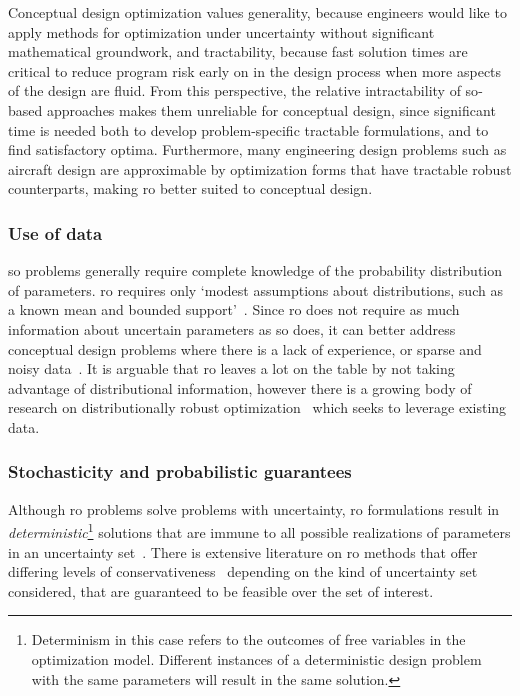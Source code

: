 Conceptual design optimization values generality, because engineers would like to
apply methods for optimization under uncertainty without significant mathematical groundwork,
and tractability, because fast solution times are critical
to reduce program risk early on in the design process when more aspects
of the design are fluid. From this perspective, the relative intractability of
\gls{so}-based approaches makes them unreliable for conceptual design, since significant time is
needed both to develop problem-specific tractable formulations, and to find satisfactory optima.
Furthermore,
many engineering design problems such as aircraft design are approximable by optimization
forms that have tractable robust counterparts, making \gls{ro} better suited
to conceptual design.

\subsubsection{Use of data}

\gls{so} problems generally require complete knowledge of the probability distribution of
parameters.
\gls{ro} requires only `modest assumptions  about distributions, such as a known mean and
bounded support'~\cite{Chen2007}. Since \gls{ro} does not require as much information
about uncertain parameters as \gls{so} does, it can better address conceptual design problems where there
is a lack of experience, or sparse and noisy data~\cite{Bertsimas2011}. It is arguable that \gls{ro}
leaves a lot on the table by not taking advantage of distributional information,
however there is a growing body of research on distributionally robust optimization~\cite{Bertsimas2017}
which seeks to leverage existing data.

\subsubsection{Stochasticity and probabilistic guarantees}

Although \gls{ro} problems solve problems with uncertainty,
\gls{ro} formulations result in \emph{deterministic}\footnote{Determinism in this case
refers to the outcomes of free variables in the optimization model.
Different instances of a deterministic design problem with
the same parameters will result in the same solution.} solutions that are immune
to all possible realizations of parameters in an uncertainty set~\cite{Bertsimas2011}.
There is extensive literature on \gls{ro} methods
that offer differing levels of conservativeness~\cite{Bertsimas2004}
depending on the kind of uncertainty set considered, that are guaranteed
to be feasible over the set of interest.

